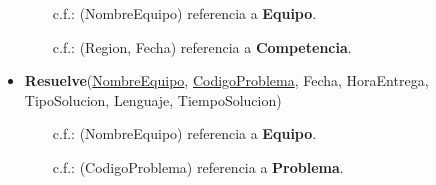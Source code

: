 \documentclass[doc, 12pt, donotrepeattitle]{apa6}
\begin{document}
\begin{itemize}
    \ \ \ \ c.f.: (NombreEquipo) referencia a \textbf{Equipo}.
    
    \ \ \ \ c.f.: (Region, Fecha) referencia a \textbf{Competencia}.
    \item \textbf{Resuelve}(\underline{NombreEquipo}, \underline{CodigoProblema}, Fecha, HoraEntrega, TipoSolucion, Lenguaje, TiempoSolucion)
    
    \ \ \ \ c.f.: (NombreEquipo) referencia a \textbf{Equipo}.
    
    \ \ \ \ c.f.: (CodigoProblema) referencia a \textbf{Problema}.
\end{itemize}


\end{document}
